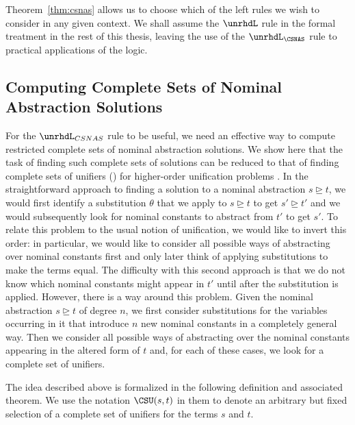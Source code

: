 Theorem~\ref{thm:csnas} allows us to choose which of the left rules we
wish to consider in any given context. We shall assume the $\unrhdL$
rule in the formal treatment in the rest of this thesis, leaving the
use of the $\unrhdL_{\CSNAS}$ rule to practical applications of the
logic.


\subsection{Computing Complete Sets of Nominal Abstraction
  Solutions}\label{ssec:complete-sets}

For the $\unrhdL_{CSNAS}$ rule to be useful, we need an effective way
to compute restricted complete sets of nominal abstraction
solutions. We show here that the task of finding such complete sets of
solutions can be reduced to that of finding complete sets of unifiers
(\CSU) for higher-order unification problems \cite{huet75tcs}. In the
straightforward approach to finding a solution to a nominal
abstraction $s \unrhd t$, we would first identify a substitution
$\theta$ that we apply to $s \unrhd t$ to get $s' \unrhd t'$ and we
would subsequently look for nominal constants to abstract from $t'$ to
get $s'$.  To relate this problem to the usual notion of unification,
we would like to invert this order: in particular, we would like to
consider all possible ways of abstracting over nominal constants first
and only later think of applying substitutions to make the terms
equal. The difficulty with this second approach is that we do not know
which nominal constants might appear in $t'$ until after the
substitution is applied. However, there is a way around this
problem. Given the nominal abstraction $s \unrhd t$ of degree $n$, we
first consider substitutions for the variables occurring in it that
introduce $n$ new nominal constants in a completely general way.  Then
we consider all possible ways of abstracting over the nominal
constants appearing in the altered form of $t$ and, for each of these
cases, we look for a complete set of unifiers.

The idea described above is formalized in the following definition and
associated theorem. We use the notation $\CSU(s,t)$ in them to denote
an arbitrary but fixed selection of a complete set of unifiers for
the terms $s$ and $t$.

